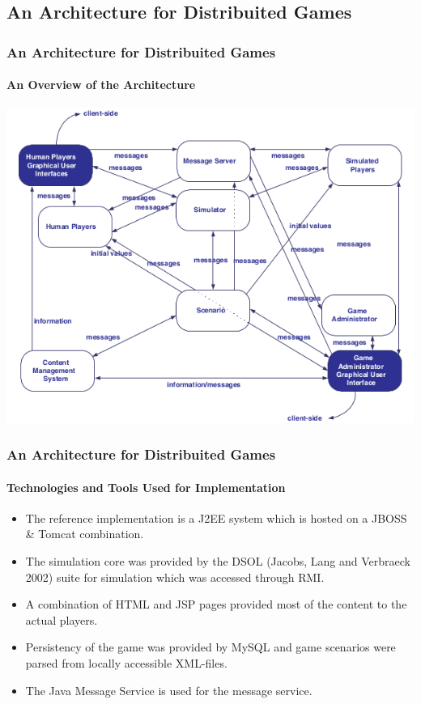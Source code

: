 \subsection{An Architecture for Distribuited Games}

\begin{frame}
\frametitle{An Architecture for Distribuited Games}
\framesubtitle{An Overview of the Architecture}
\begin{center}
\includegraphics[scale=.85]{vanhouten.png}
\end{center}
\end{frame}

\begin{frame}
\frametitle{An Architecture for Distribuited Games}
\framesubtitle{Technologies and Tools Used for Implementation}
\begin{itemize}[<+->]
\item
The reference implementation is a J2EE system which is
hosted on a JBOSS \& Tomcat combination.
\item
The simulation core was provided by the DSOL (Jacobs, Lang and Verbraeck
2002) suite for simulation which was accessed through RMI.
\item
A combination of HTML and JSP pages provided most of the
content to the actual players.
\item
Persistency of the game was
provided by MySQL and game scenarios were parsed from
locally accessible XML-files.
\item
The Java Message Service is
 used for the message service.
\end{itemize}
\end{frame}
